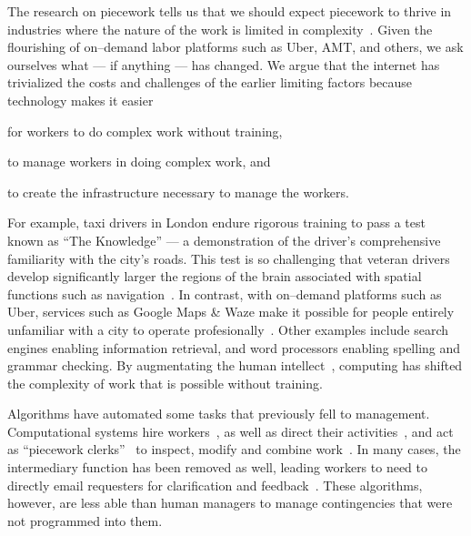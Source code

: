 \documentclass[trackingWork]{subfiles}
\begin{document}
The research on piecework tells us that
we should expect piecework to thrive in industries where
the nature of the work is limited in complexity~\cite{Brown01041990}.
Given the flourishing of on--demand labor platforms such as
Uber, AMT, and others, we ask ourselves
what --- if anything --- has changed.
We argue that
the internet has trivialized
the costs and challenges of the earlier limiting factors
because technology makes it easier
\begin{inlinelist}
\item for workers to do complex work without training,
\item to manage workers in doing complex work, and 
\item to create the infrastructure necessary to manage the workers.
\end{inlinelist}

For example, taxi drivers in London endure rigorous training to pass a test known as ``The Knowledge''
--- a demonstration of the driver's comprehensive familiarity with the city's roads.
This test is so challenging that veteran drivers develop significantly larger
the regions of the brain associated with spatial functions such as navigation~\cite{Maguire11042000,Maguire2894,Skok:1999:KML:299513.299625,
      skok2000managing,Woollett1407,woollett2011acquiring}.
In contrast, with on--demand platforms such as Uber, services such as Google Maps \& Waze make it possible for
people entirely unfamiliar with a city
to operate profesionally~\cite{silva2013traffic,hind2014outsmarting}.
Other examples include search engines enabling information retrieval, and word processors enabling spelling and grammar checking.
By augmentating the human intellect~\cite{engelbart2001augmenting}, computing has shifted the complexity of work that is possible without training.

Algorithms have automated some tasks that previously fell to management.
Computational systems hire workers~\cite{turkitLittle,weld2010decision}, as well as direct their activities~\cite{uberAlgorithm}, and act as ``piecework clerks''~\cite{10.2307/23702539} to inspect, modify and combine work~\cite{turkopticon,takingAHITMcInnis}.
In many cases, the intermediary function has been removed as well, leading workers to need to directly email requesters for clarification and feedback~\cite{martin2014being}.
These algorithms, however, are less able than human managers to manage contingencies that were not programmed into them.
\end{document}
